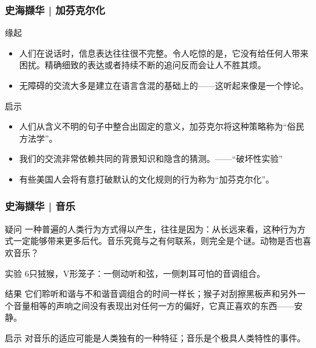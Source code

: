 \begin{frame}
  \frametitle{史海撷华 | 加芬克尔化}
  \begin{block}{缘起}
    \begin{itemize}
      \item 人们在说话时，信息表达往往很不完整。令人吃惊的是，它没有给任何人带来困扰。精确细致的表达或者持续不断的追问反而会让人不胜其烦。
      \item \alert{无障碍的交流大多是建立在语言含混的基础上的}——这听起来像是一个悖论。
    \end{itemize}
  \end{block}
  \pause
  \begin{block}{启示}
    \begin{itemize}
      \item 人们从含义不明的句子中整合出固定的意义，加芬克尔将这种策略称为“俗民方法学”。
      \item \alert{我们的交流非常依赖共同的背景知识和隐含的猜测。}——“破坏性实验”
      \item 有些美国人会将有意打破默认的文化规则的行为称为“加芬克尔化”。
    \end{itemize}
  \end{block}
\end{frame}

\begin{frame}
  \frametitle{史海撷华 | 音乐}
  \begin{block}{疑问}
      一种普遍的人类行为方式得以产生，往往是因为：从长远来看，这种行为方式一定能够带来更多后代。音乐究竟与之有何联系，则完全是个谜。动物是否也喜欢音乐？
  \end{block}
  \vspace{-0.5em}
  \pause
  \begin{block}{实验}
    6只狨猴，V形笼子：一侧动听和弦，一侧刺耳可怕的音调组合。
  \end{block}
  \vspace{-0.5em}
  \pause
  \begin{block}{结果}
    它们聆听和谐与不和谐音调组合的时间一样长；猴子对刮擦黑板声和另外一个音量相等的声响之间没有表现出对任何一方的偏好，它真正喜欢的东西——安静。
  \end{block}
  \vspace{-0.5em}
  \pause
  \begin{block}{启示}
    对音乐的适应可能是人类独有的一种特征；\alert{音乐是个极具人类特性的事件}。
  \end{block}
\end{frame}

